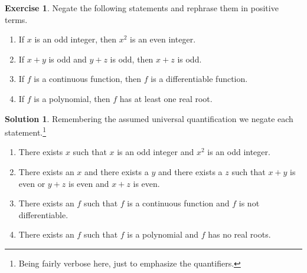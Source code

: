 \documentclass[a4paper, 11pt]{report}
\theoremstyle{plain}
\theoremstyle{definition}
\newtheorem{exrc}[thm]{Exercise}
\newtheorem*{sltn}{Solution}
\begin{document}
  \begin{exrc}
    Negate the following statements and rephrase them in positive terms.
    \begin{enumerate}
      \item If $x$ is an odd integer, then $x^2$ is an even integer.
      \item If $x + y$ is odd and $y + z$ is odd, then $x + z$ is odd.
      \item If $f$ is a continuous function, then $f$ is a differentiable
        function.
      \item If $f$ is a polynomial, then $f$ has at least one real root.
    \end{enumerate}
  \end{exrc}
  \begin{sltn}
    Remembering the assumed universal quantification we negate each
    statement.\footnote{Being fairly verbose here, just to emphasize the
    quantifiers.}
    \begin{enumerate}
      \item There exists $x$ such that $x$ is an odd integer and $x^2$ is an
        odd integer.
      \item There exists an $x$ and there exists a $y$ and there exists a $z$
        such that $x + y$ is even or $y + z$ is even and $x + z$ is even.
      \item There exists an $f$ such that $f$ is a continuous function and $f$
        is not differentiable.
      \item There exists an $f$ such that $f$ is a polynomial and $f$ has no
        real roots.
    \end{enumerate}
  \end{sltn}
\end{document}
